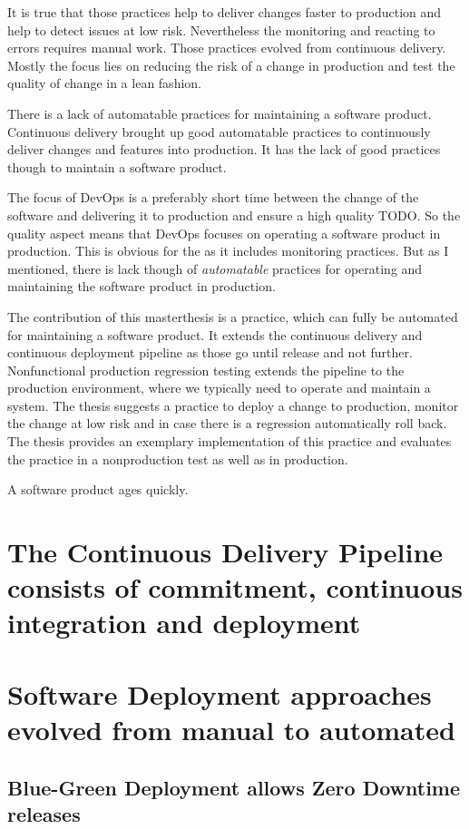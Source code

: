 It is true that those practices help to deliver changes faster to production and help to
detect issues at low risk. Nevertheless the monitoring and reacting to errors requires
manual work. Those practices evolved from continuous delivery. Mostly the focus lies on
reducing the risk of a change in production and test the quality of change in a lean
fashion.

There is a lack of automatable practices for maintaining a software product. Continuous
delivery brought up good automatable practices to continuously deliver changes and
features into production. It has the lack of good practices though to maintain a software
product.

The focus of DevOps is a preferably short time between the change of the software and
delivering it to production and ensure a high quality TODO. So the quality aspect means
that DevOps focuses on operating a software product in production. This is obvious for the
as it includes monitoring practices. But as I mentioned, there is lack though of
\emph{automatable} practices for operating and maintaining the software product in
production.

The contribution of this masterthesis is a practice, which can fully be automated for
maintaining a software product. It extends the continuous delivery and continuous
deployment pipeline as those go until release and not further. Nonfunctional production
regression testing extends the pipeline to the production environment, where we typically
need to operate and maintain a system. The thesis suggests a practice to deploy a change
to production, monitor the change at low risk and in case there is a regression
automatically roll back. The thesis provides an exemplary implementation of this practice
and evaluates the practice in a nonproduction test as well as in production.


A software product ages quickly.


\section{The Continuous Delivery Pipeline consists of commitment, continuous integration
and deployment}
\section{Software Deployment approaches evolved from manual to automated}
\subsection{Blue-Green Deployment allows Zero Downtime releases}

